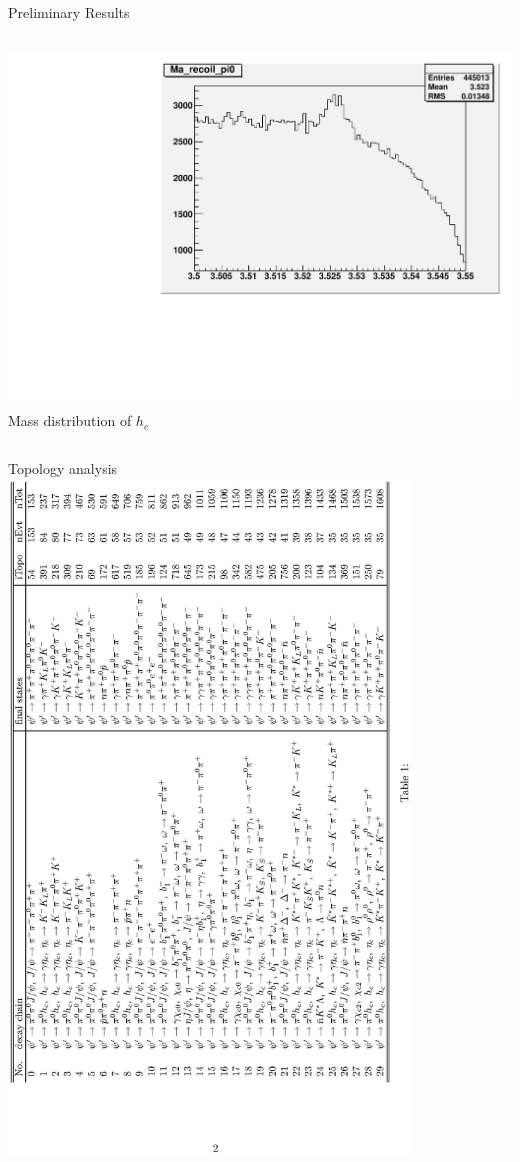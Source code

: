 \documentclass{beamer}
\begin{document}
\begin{frame}{Preliminary Results}
\begin{columns}
\begin{column}{0.5\textwidth}
\begin{center}
\includegraphics[width=0.4\textheight,angle=0]{figures/Pi0_recoil.pdf}\\
Mass distribution of $h_c$
\end{center}
\end{column}
\end{columns}
\end{frame}
\begin{frame}{Topology analysis}
\vskip -1.5cm
\includegraphics[width=0.8\textwidth, angle=270]{figures/notice_recoil.eps}
\end{frame}
\end{document}
